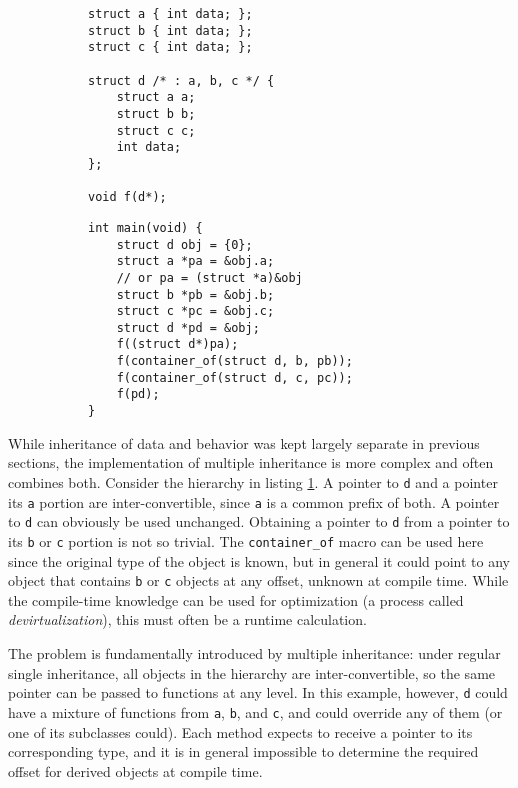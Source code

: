 \begin{figure}[ht]
    \centering
    \begin{subfigure}[t]{0.4\textwidth}
        \begin{lstlisting}[style=c]
struct a { int data; };
struct b { int data; };
struct c { int data; };

struct d /* : a, b, c */ {
    struct a a;
    struct b b;
    struct c c;
    int data;
};

void f(d*);
        \end{lstlisting}
    \end{subfigure}
    \begin{subfigure}[t]{0.5\textwidth}
        \begin{lstlisting}[style=c]
int main(void) {
    struct d obj = {0};
    struct a *pa = &obj.a;
    // or pa = (struct *a)&obj
    struct b *pb = &obj.b;
    struct c *pc = &obj.c;
    struct d *pd = &obj;
    f((struct d*)pa);
    f(container_of(struct d, b, pb));
    f(container_of(struct d, c, pc));
    f(pd);
}
        \end{lstlisting}
    \end{subfigure}
    \label{lst:c++:multiple}
\end{figure}

While inheritance of data and behavior was kept largely separate in previous
sections, the implementation of multiple inheritance is more complex and often
combines both\footnotemark.  Consider the hierarchy in listing
\ref{lst:c++:multiple}.  A pointer to \texttt{d} and a pointer its \texttt{a}
portion are inter-convertible, since \texttt{a} is a common prefix of both.  A
pointer to \texttt{d} can obviously be used unchanged.  Obtaining a pointer to
\texttt{d} from a pointer to its \texttt{b} or \texttt{c} portion is not so
trivial.  The \texttt{container\_of} macro can be used here since the original
type of the object is known, but in general it could point to any object that
contains \texttt{b} or \texttt{c} objects at any offset, unknown at compile
time.  While the compile-time knowledge can be used for optimization (a process
called \textit{devirtualization}), this must often be a runtime calculation.


The problem is fundamentally introduced by multiple inheritance: under regular
single inheritance, all objects in the hierarchy are inter-convertible, so the
same pointer can be passed to functions at any level.  In this example, however,
\texttt{d} could have a mixture of functions from \texttt{a}, \texttt{b}, and
\texttt{c}, and could override any of them (or one of its subclasses could).
Each method expects to receive a pointer to its corresponding type, and it is in
general impossible to determine the required offset for derived objects at
compile time.

